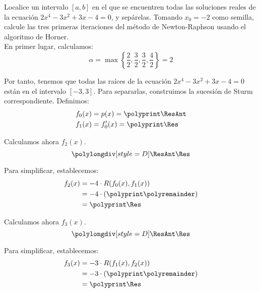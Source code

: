 \begin{ejercicio}\label{ej:1.1.8}
    Localice un intervalo $[a, b]$ en el que se encuentren todas las soluciones reales de la ecuación $2x^4 - 3x^2 + 3x - 4 = 0$, y sepárelas. Tomando $x_0 = -2$ como semilla, calcule las tres primeras iteraciones del método de Newton-Raphson usando el algoritmo de Horner.\\


    En primer lugar, calculamos:
    \begin{equation*}
        \alpha=\max\left\{\dfrac{2}{2}, \dfrac{3}{2}, \dfrac{3}{2}, \dfrac{4}{2}\right\}=2
    \end{equation*}

    Por tanto, tenemos que todas las raíces de la ecuación $2x^4-3x^2+3x-4=0$ están en el intervalo $[-3,3]$. Para separarlas, construimos la sucesión de Sturm correspondiente.
    Definimos:
    \polymul{}
    \polymul{}
    \begin{align*}
        f_0(x) &= p(x) = \polyprint\ResAnt\\
        f_1(x) &= f_0'(x) = \polyprint\Res
    \end{align*}

    Calculamos ahora $f_2(x)$.
    \begin{equation*}
        \polylongdiv[style=D]\ResAnt\Res
    \end{equation*}
    \polydiv\div\ResAnt\Res
    \polymul\ResAnt{}
    \polymul\Res{}

    Para simplificar, establecemos:
    \begin{align*}
        f_2(x) &= -4\cdot R(f_0(x), f_1(x))\\
        &= -4\cdot \left(\polyprint\polyremainder\right)\\
        &= \polyprint\Res
    \end{align*}

    Calculamos ahora $f_3(x)$.
    \begin{equation*}
        \polylongdiv[style=D]\ResAnt\Res
    \end{equation*}
    \polydiv\div\ResAnt\Res
    \polymul\ResAnt{}
    \polymul\Res{}

    Para simplificar, establecemos:
    \begin{align*}
        f_3(x) &= -3\cdot R(f_1(x), f_2(x))\\
        &= -3\cdot \left(\polyprint\polyremainder\right)\\
        &= \polyprint\Res
    \end{align*}


\end{ejercicio}
